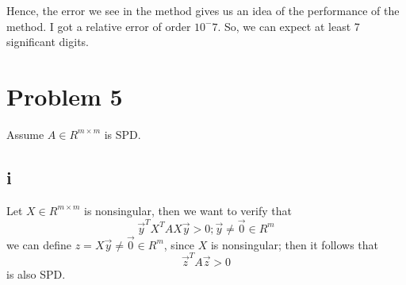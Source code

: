 \documentclass[10pt]{article}
\begin{document}
Hence, the error we see in the method gives us an idea of the
performance of the method. I got a relative error of order $10^-7$. So,
 we can expect at least 7 significant digits.



\section{Problem 5}
Assume $A\in R^{m \times m}$ is SPD.
\subsection{i}
  Let $X\in  R^{m \times m}$ is nonsingular, then we want to verify
that 
  \[
  \vec{y}^T X^TAX\vec{y} >0; \vec{y}\neq \vec{0}\in R^m 
  \]
  we can define $z=X\vec{y} \neq \vec{0} \in R^m$, since $X$ is 
  nonsingular; then it follows that
  \[
  \vec{z}^TA \vec{z} >0
  \]
  is also SPD.
\end{document}
